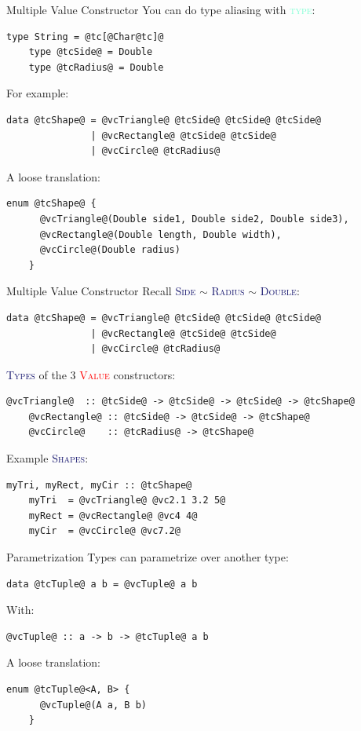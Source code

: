 \documentclass[xcolor={usenames,dvipsnames}]{beamer}
\newcommand{\hkeyword}[1]{\textcolor{Aquamarine}{\textsc{#1}}}
\newcommand{\htycon}[1]{\textcolor{MidnightBlue}{\textsc{#1}}}
\newcommand{\hvalcon}[1]{\textcolor{Red}{\textsc{#1}}}
\begin{document}
\begin{frame}[fragile]{Multiple Value Constructor}
  You can do type aliasing with \hkeyword{type}:
  \begin{lstlisting}[style=hask]
    type String = @tc[@Char@tc]@
    type @tcSide@ = Double
    type @tcRadius@ = Double
  \end{lstlisting}

  For example:
  \begin{lstlisting}[style=hask]
    data @tcShape@ = @vcTriangle@ @tcSide@ @tcSide@ @tcSide@
               | @vcRectangle@ @tcSide@ @tcSide@
               | @vcCircle@ @tcRadius@
  \end{lstlisting}

  A loose translation:
  \begin{lstlisting}[style=hask]
    enum @tcShape@ {
      @vcTriangle@(Double side1, Double side2, Double side3),
      @vcRectangle@(Double length, Double width),
      @vcCircle@(Double radius)
    }
  \end{lstlisting}
\end{frame}

\begin{frame}[fragile]{Multiple Value Constructor}
  Recall \htycon{Side} $\sim$ \htycon{Radius} $\sim$ \htycon{Double}:
  \begin{lstlisting}[style=hask]
    data @tcShape@ = @vcTriangle@ @tcSide@ @tcSide@ @tcSide@
               | @vcRectangle@ @tcSide@ @tcSide@
               | @vcCircle@ @tcRadius@
  \end{lstlisting}

  \htycon{Types} of the 3 \hvalcon{Value} constructors:
  \begin{lstlisting}[style=hask]
    @vcTriangle@  :: @tcSide@ -> @tcSide@ -> @tcSide@ -> @tcShape@
    @vcRectangle@ :: @tcSide@ -> @tcSide@ -> @tcShape@
    @vcCircle@    :: @tcRadius@ -> @tcShape@
  \end{lstlisting}

  Example \htycon{Shapes}:
  \begin{lstlisting}[style=hask]
    myTri, myRect, myCir :: @tcShape@
    myTri  = @vcTriangle@ @vc2.1 3.2 5@
    myRect = @vcRectangle@ @vc4 4@
    myCir  = @vcCircle@ @vc7.2@
  \end{lstlisting}
\end{frame}

\begin{frame}[fragile]{Parametrization}
  Types can parametrize over another type:
  \begin{lstlisting}[style=hask]
    data @tcTuple@ a b = @vcTuple@ a b
  \end{lstlisting}

  With:
  \begin{lstlisting}[style=hask]
    @vcTuple@ :: a -> b -> @tcTuple@ a b
  \end{lstlisting}

  A loose translation:
  \begin{lstlisting}[style=hask]
    enum @tcTuple@<A, B> {
      @vcTuple@(A a, B b)
    }
  \end{lstlisting}
\end{frame}
\end{document}
